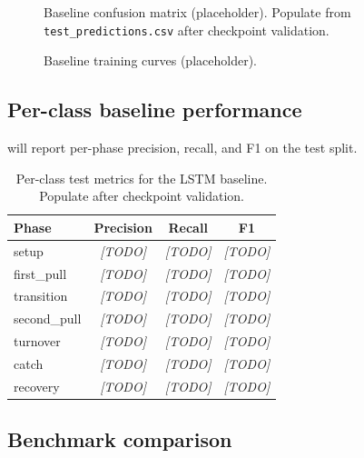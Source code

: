 \begin{figure}[t]
  \centering
  \caption{Baseline confusion matrix (placeholder). Populate from \texttt{test\_predictions.csv} after checkpoint validation.}
  \label{fig:confusion_matrix}
\end{figure}

\begin{figure}[t]
  \centering
  \caption{Baseline training curves (placeholder).}
  \label{fig:training_curves}
\end{figure}

\subsection{Per-class baseline performance}
\label{sec:results:perclass}

 will report per-phase precision, recall, and F1 on the test split.

\begin{table}[t]
  \centering
  \caption{Per-class test metrics for the \acs{LSTM} baseline. Populate after checkpoint validation.}
  \label{tab:baseline_perclass}
  \begin{tabular}{lccc}
    \toprule
    Phase & Precision & Recall & F1 \\
    \midrule
    setup & \textit{[TODO]} & \textit{[TODO]} & \textit{[TODO]} \\
    first\_pull & \textit{[TODO]} & \textit{[TODO]} & \textit{[TODO]} \\
    transition & \textit{[TODO]} & \textit{[TODO]} & \textit{[TODO]} \\
    second\_pull & \textit{[TODO]} & \textit{[TODO]} & \textit{[TODO]} \\
    turnover & \textit{[TODO]} & \textit{[TODO]} & \textit{[TODO]} \\
    catch & \textit{[TODO]} & \textit{[TODO]} & \textit{[TODO]} \\
    recovery & \textit{[TODO]} & \textit{[TODO]} & \textit{[TODO]} \\
    \bottomrule
  \end{tabular}
\end{table}

\subsection{Benchmark comparison}
\label{sec:results:benchmark}

